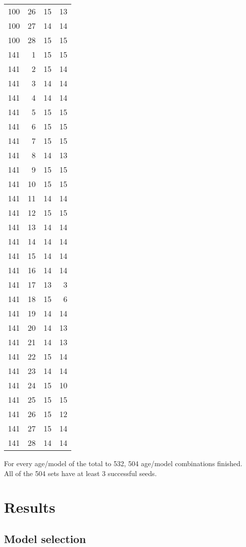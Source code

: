 \documentclass[
]{article}
\begin{document}
\begin{longtable}[]{@{}rrrr@{}}
100 & 26 & 15 & 13 \\
100 & 27 & 14 & 14 \\
100 & 28 & 15 & 15 \\
141 & 1 & 15 & 15 \\
141 & 2 & 15 & 14 \\
141 & 3 & 14 & 14 \\
141 & 4 & 14 & 14 \\
141 & 5 & 15 & 15 \\
141 & 6 & 15 & 15 \\
141 & 7 & 15 & 15 \\
141 & 8 & 14 & 13 \\
141 & 9 & 15 & 15 \\
141 & 10 & 15 & 15 \\
141 & 11 & 14 & 14 \\
141 & 12 & 15 & 15 \\
141 & 13 & 14 & 14 \\
141 & 14 & 14 & 14 \\
141 & 15 & 14 & 14 \\
141 & 16 & 14 & 14 \\
141 & 17 & 13 & 3 \\
141 & 18 & 15 & 6 \\
141 & 19 & 14 & 14 \\
141 & 20 & 14 & 13 \\
141 & 21 & 14 & 13 \\
141 & 22 & 15 & 14 \\
141 & 23 & 14 & 14 \\
141 & 24 & 15 & 10 \\
141 & 25 & 15 & 15 \\
141 & 26 & 15 & 12 \\
141 & 27 & 15 & 14 \\
141 & 28 & 14 & 14 \\
\bottomrule()
\end{longtable}

For every age/model of the total to 532, 504 age/model combinations
finished. All of the 504 sets have at least 3 successful seeds.

\hypertarget{results}{%
\section{Results}\label{results}}

\hypertarget{model-selection}{%
\subsection{Model selection}\label{model-selection}}
\end{document}
